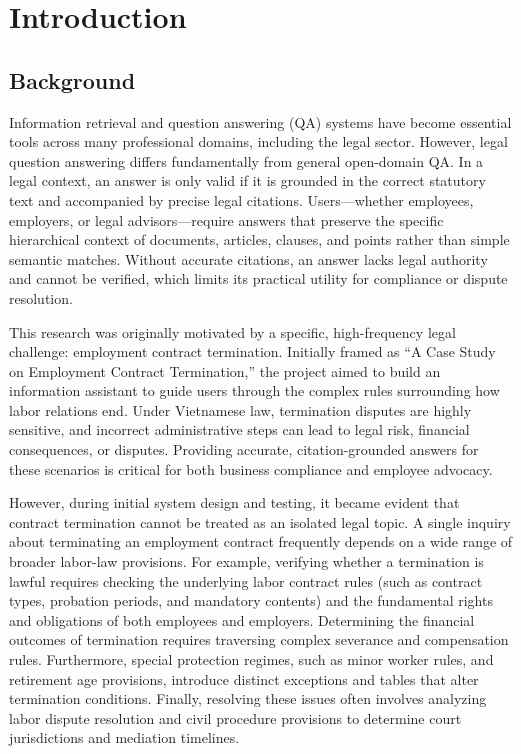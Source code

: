\chapter{Introduction}

\section{Background}
Information retrieval and question answering (QA) systems have become essential tools across many professional domains, including the legal sector. However, legal question answering differs fundamentally from general open-domain QA. In a legal context, an answer is only valid if it is grounded in the correct statutory text and accompanied by precise legal citations. Users—whether employees, employers, or legal advisors—require answers that preserve the specific hierarchical context of documents, articles, clauses, and points rather than simple semantic matches. Without accurate citations, an answer lacks legal authority and cannot be verified, which limits its practical utility for compliance or dispute resolution.

This research was originally motivated by a specific, high-frequency legal challenge: employment contract termination. Initially framed as ``A Case Study on Employment Contract Termination,'' the project aimed to build an information assistant to guide users through the complex rules surrounding how labor relations end. Under Vietnamese law, termination disputes are highly sensitive, and incorrect administrative steps can lead to legal risk, financial consequences, or disputes. Providing accurate, citation-grounded answers for these scenarios is critical for both business compliance and employee advocacy.

However, during initial system design and testing, it became evident that contract termination cannot be treated as an isolated legal topic. A single inquiry about terminating an employment contract frequently depends on a wide range of broader labor-law provisions. For example, verifying whether a termination is lawful requires checking the underlying labor contract rules (such as contract types, probation periods, and mandatory contents) and the fundamental rights and obligations of both employees and employers. Determining the financial outcomes of termination requires traversing complex severance and compensation rules. Furthermore, special protection regimes, such as minor worker rules, and retirement age provisions, introduce distinct exceptions and tables that alter termination conditions. Finally, resolving these issues often involves analyzing labor dispute resolution and civil procedure provisions to determine court jurisdictions and mediation timelines.

